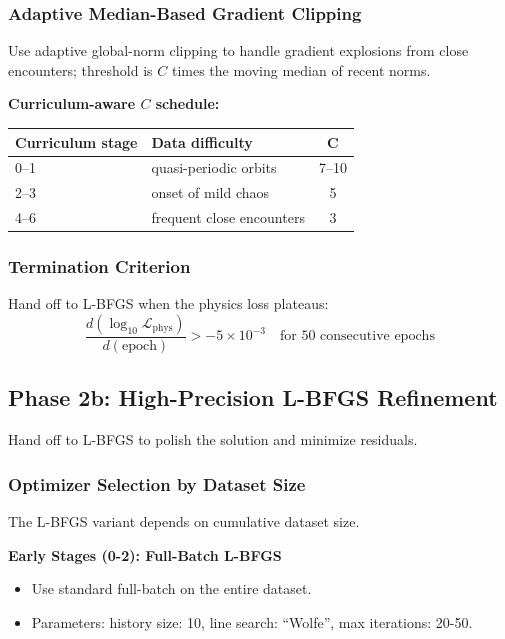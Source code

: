 \subsubsection{Adaptive Median-Based Gradient Clipping}

Use adaptive global-norm clipping to handle gradient explosions from close encounters; threshold is $C$ times the moving median of recent norms.

\textbf{Curriculum-aware $C$ schedule:}
\begin{table}[H]
    \centering
    \begin{tabular}{|l|l|c|}
    \hline
    \textbf{Curriculum stage} & \textbf{Data difficulty} & \textbf{C} \\
    \hline
    0--1 & quasi-periodic orbits & 7--10 \\
    2--3 & onset of mild chaos & 5 \\
    4--6 & frequent close encounters & 3 \\
    \hline
    \end{tabular}
\end{table}

\subsubsection{Termination Criterion}
Hand off to L-BFGS when the physics loss plateaus:
\begin{equation}
\frac{d(\log_{10} \mathcal{L}_{\text{phys}})}{d(\text{epoch})} > -5 \times 10^{-3} \quad \text{for 50 consecutive epochs}
\end{equation}

\subsection{Phase 2b: High-Precision L-BFGS Refinement}

Hand off to L-BFGS to polish the solution and minimize residuals.

\subsubsection{Optimizer Selection by Dataset Size}
The L-BFGS variant depends on cumulative dataset size.

\textbf{Early Stages (0-2): Full-Batch L-BFGS}
\begin{itemize}
    \item Use standard full-batch on the entire dataset.
    \item Parameters: history size: 10, line search: ``Wolfe'', max iterations: 20-50.
\end{itemize}

